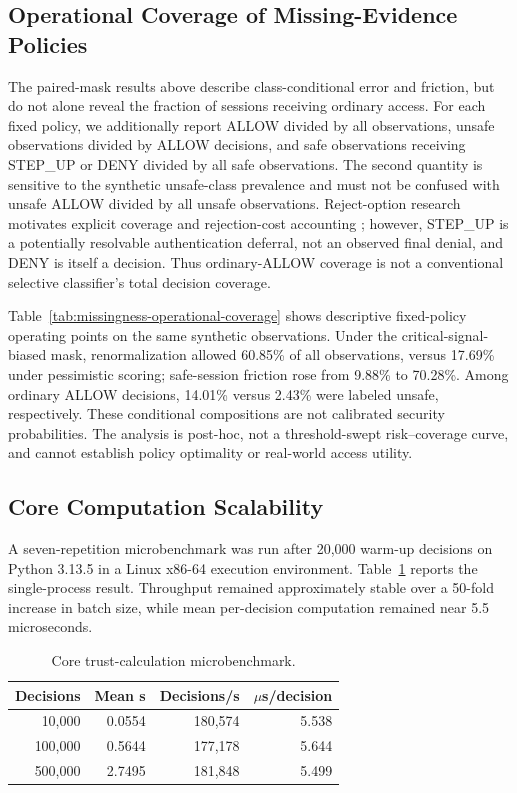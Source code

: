 \documentclass[journal]{IEEEtran}
\begin{document}
\subsection{Operational Coverage of Missing-Evidence Policies}
The paired-mask results above describe class-conditional error and friction, but
do not alone reveal the fraction of sessions receiving ordinary access. For
each fixed policy, we additionally report ALLOW divided by all observations,
unsafe observations divided by ALLOW decisions, and safe observations
receiving STEP\_UP or DENY divided by all safe observations. The second
quantity is sensitive to the synthetic unsafe-class prevalence and must not
be confused with unsafe ALLOW divided by all unsafe observations.
Reject-option research motivates explicit coverage and rejection-cost
accounting \cite{franc2023reject}; however, STEP\_UP is a potentially
resolvable authentication deferral, not an observed final denial, and DENY
is itself a decision. Thus ordinary-ALLOW coverage is not a conventional
selective classifier's total decision coverage.


Table~\ref{tab:missingness-operational-coverage} shows descriptive
fixed-policy operating points on the same synthetic observations. Under
the critical-signal-biased mask, renormalization allowed 60.85\% of all
observations, versus 17.69\% under pessimistic scoring; safe-session
friction rose from 9.88\% to 70.28\%. Among ordinary ALLOW decisions,
14.01\% versus 2.43\% were labeled unsafe, respectively. These
conditional compositions are not calibrated security probabilities.
The analysis is post-hoc, not a threshold-swept risk--coverage curve,
and cannot establish policy optimality or real-world access utility.

\subsection{Core Computation Scalability}
A seven-repetition microbenchmark was run after 20,000 warm-up decisions on Python
3.13.5 in a Linux x86-64 execution environment. Table~\ref{tab:scale} reports the
single-process result. Throughput remained approximately stable over a 50-fold increase
in batch size, while mean per-decision computation remained near 5.5 microseconds.

\begin{table}[ht]
\centering
\caption{Core trust-calculation microbenchmark.}
\label{tab:scale}
\begin{tabular}{rrrr}
\toprule
Decisions & Mean s & Decisions/s & $\mu$s/decision \\
\midrule
10,000 & 0.0554 & 180,574 & 5.538 \\
100,000 & 0.5644 & 177,178 & 5.644 \\
500,000 & 2.7495 & 181,848 & 5.499 \\
\bottomrule
\end{tabular}
\end{table}
\end{document}
